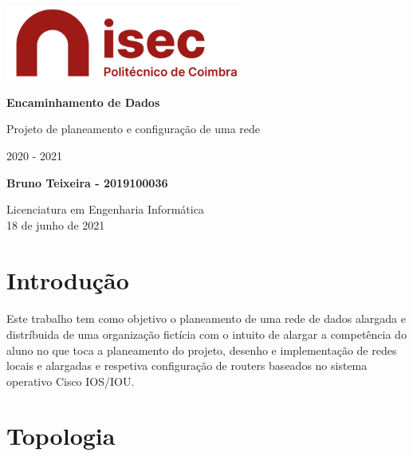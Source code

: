 \documentclass[11pt]{article}
\begin{document}
	\begin{titlepage}
    	\begin{center}
    		\includegraphics[width=0.6\textwidth]{logo-isec}
    		
    		\vspace*{\fill}
    		
    		\Huge
    		\textbf{Encaminhamento de Dados}
    		
    		\huge
    		Projeto de planeamento e configuração de uma rede
    		
    		\vspace{0.5cm}
    		\LARGE
    		2020 - 2021
    		
    		\vspace{1.5cm}
    		
    		\textbf{Bruno Teixeira - 2019100036}
    		
    		\vfill
    		\vspace*{\fill}
    		
    		\normalsize
    		Licenciatura em Engenharia Informática \\
    		18 de junho de 2021		
    	\end{center}
    \end{titlepage}
	


	\tableofcontents
	\pagebreak
	\listoffigures
	\pagebreak
	
	\large	
	\section{Introdução}
	\normalsize
	\paragraph{}
	Este trabalho tem como objetivo o planeamento de uma rede de dados alargada e distríbuida de uma organização fictícia com o intuito de alargar a competência do aluno no que toca a planeamento do projeto, desenho e implementação de redes locais e alargadas e respetiva configuração de routers baseados no sistema operativo Cisco IOS/IOU.    
    
	\large
	\section{Topologia}
	\normalsize
	
\end{document}

